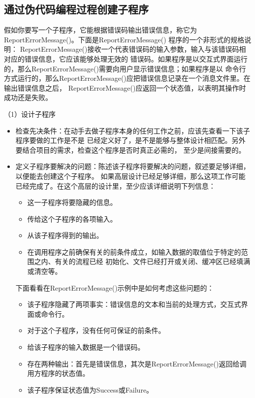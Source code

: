 \documentclass{article}
\begin{document}
\subsection{通过伪代码编程过程创建子程序}
假如你要写一个子程序，它能根据错误码输出错误信息，称它为ReportErrorMessage()。下面是ReportErrorMessage()
程序的一个非形式的规格说明：
ReportErrorMessage()接收一个代表错误码的输入参数，输入与该错误码相对应的错误信息，它应该能够处理无效的
错误码。如果程序是以交互式界面运行的，那么ReportErrorMessage()需要向用户显示错误信息；如果程序是以
命令行方式运行的，那么ReportErrorMessage()应把错误信息记录在一个消息文件里。在输出错误信息之后，
ReportErrorMessage()应返回一个状态值，以表明其操作时成功还是失败。

\par
（1）设计子程序
\par
\begin{itemize}
    \item 检查先决条件：在动手去做子程序本身的任何工作之前，应该先查看一下该子程序要做的工作是不是
    已经定义好了，是不是能够与整体设计相匹配。另外要结合项目的需求，检查这个程序是否时真正必需的，
    至少是间接需要的。
    \item 定义子程序要解决的问题：陈述该子程序将要解决的问题，叙述要足够详细，以便能去创建这个子程序。
    如果高层设计已经足够详细，那么这项工作可能已经完成了。在这个高层的设计里，至少应该详细说明下列信息：
    \begin{itemize}
        \item 这一子程序将要隐藏的信息。
        \item 传给这个子程序的各项输入。
        \item 从该子程序得到的输出。
        \item 在调用程序之前确保有关的前条件成立，如输入数据的取值位于特定的范围之内、有关的流程已经
        初始化、文件已经打开或关闭、缓冲区已经填满或清空等。
    \end{itemize}
    下面看看在ReportErrorMessage()示例中是如何考虑这些问题的：
    \begin{itemize}
        \item 该子程序隐藏了两项事实：错误信息的文本和当前的处理方式，交互式界面或命令行。
        \item 对于这个子程序，没有任何可保证的前条件。
        \item 给该子程序的输入数据是一个错误码。
        \item 存在两种输出：首先是错误信息，其次是ReportErrorMessage()返回给调用方程序的状态值。
        \item 该子程序保证状态值为Success或Failure。

\end{itemize}
\end{itemize}
\end{document}
